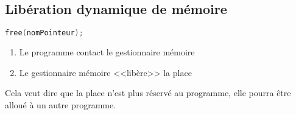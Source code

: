 \subsection{Libération dynamique de mémoire}
\begin{lstlisting}[language=C, numbers=none,frame=none]
free(nomPointeur);
\end{lstlisting}
\begin{enumerate}
	\item Le programme contact le gestionnaire mémoire 
	\item Le gestionnaire mémoire <<libère>> la place
\end{enumerate}

Cela veut dire que la place n'est plus réservé au programme, elle pourra être alloué à un autre programme.

